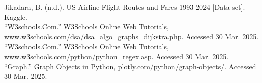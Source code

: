 \documentclass[fontsize=11pt]{article}
\begin{document}
Jikadara, B. (n.d.). US Airline Flight Routes and Fares 1993-2024 [Data set]. Kaggle.\\ 
“W3schools.Com.” W3Schools Online Web Tutorials, www.w3schools.com/dsa/dsa\_algo\_graphs\_dijkstra.php. Accessed 30 Mar. 2025. \\
“W3schools.Com.” W3Schools Online Web Tutorials, www.w3schools.com/python/python\_regex.asp. Accessed 30 Mar. 2025. \\
“Graph.” Graph Objects in Python, plotly.com/python/graph-objects/. Accessed 30 Mar. 2025. 

\end{document}
